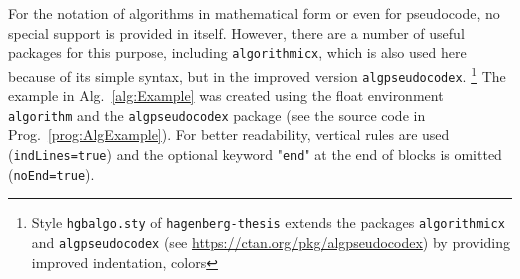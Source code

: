 For the notation of algorithms in mathematical form or even for pseudocode,
no special support is provided in \latex itself. However, there are a number
of useful \latex packages for this purpose, including \texttt{algorithmicx},
 which is also used here because of its simple syntax, but in the improved
version \texttt{algpseudocodex}.%
\footnote{Style \nolinkurl{hgbalgo.sty} of \texttt{hagenberg-thesis}
extends the packages \texttt{algorithmicx} and \texttt{algpseudocodex} 
(see \url{https://ctan.org/pkg/algpseudocodex}) by providing improved
indentation, colors \etc}
%
The example in Alg.~\ref{alg:Example} was created using the float environment
\texttt{algorithm} and the \texttt{algpseudocodex} package (see the source
code in Prog.\ \ref{prog:AlgExample}). For better readability, vertical
rules are used (\texttt{indLines=true}) and the optional keyword 
"\texttt{end}" at the end of blocks is omitted (\texttt{noEnd=true}).



